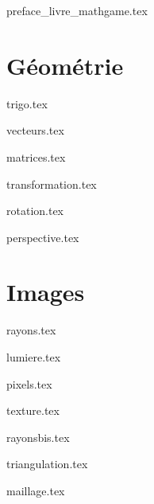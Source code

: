 \documentclass[11pt]{report}
\begin{document}
	

\renewcommand{\contentsname}{Sommaire}

{preface_livre_mathgame.tex}
\debutchapitres
{}




\clearemptydoublepage


\part{Géométrie}

{trigo.tex}

{vecteurs.tex}

{matrices.tex}

{transformation.tex}

{rotation.tex}

{perspective.tex}



\part{Images}

{rayons.tex}

{lumiere.tex}

{pixels.tex}

{texture.tex}

{rayonsbis.tex}

{triangulation.tex}

{maillage.tex}


\end{document}
